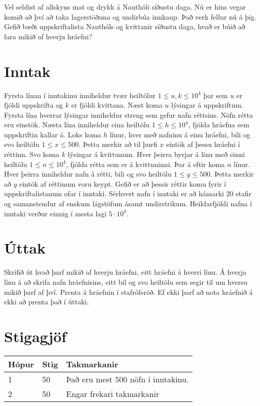 
Vel seldist af allskyns mat og drykk á Nauthóli síðustu daga. Nú er hins vegar
komið að því að taka lagerstöðuna og undirbúa innkaup. Það verk fellur nú á þig.
Gefið bæði uppskriftalista Nauthóls og kvittanir síðustu daga, hvað er búið að fara
mikið af hverju hráefni?

\section*{Inntak}
Fyrsta línan í inntakinu inniheldur tvær heiltölur $1 \leq u, k \leq 10^4$ þar sem
$u$ er fjöldi uppskrifta og $k$ er fjöldi kvittana. Næst koma $u$ lýsingar á uppskriftum.
Fyrsta lína hverrar lýsingar inniheldur streng sem gefur nafn réttsins. Nöfn rétta eru einstök.
Næsta lína inniheldur eina heiltölu $1 \leq h \leq 10^4$, fjölda hráefna sem uppskriftin
kallar á. Loks koma $h$ línur, hver með nafninu á einu hráefni, bili og svo heiltölu $1 \leq x \leq 500$.
Þetta merkir að til þurfi $x$ eintök af þessu hráefni í réttinn.
Svo koma $k$ lýsingar á kvittunum. Hver þeirra byrjar á línu með einni heiltölu $1 \leq n \leq 10^4$,
fjölda rétta sem er á kvittuninni. Þar á eftir koma $n$ línur. Hver þeirra inniheldur nafn á rétti,
bili og svo heiltölu $1 \leq y \leq 500$. Þetta merkir að $y$ eintök af réttinum voru keypt. Gefið
er að þessir réttir komu fyrir í uppskriftalistanum ofar í inntaki. Sérhvert nafn í inntaki er að hámarki
$20$ stafir og samanstendur af enskum lágstöfum ásamt undirstrikum. Heildarfjöldi nafna í inntaki verður
einnig í mesta lagi $5 \cdot 10^4$.

\section*{Úttak}
Skrifið út hvað þarf mikið af hverju hráefni, eitt hráefni á hverri línu. Á hverja línu á að skrifa
nafn hráefnisins, eitt bil og svo heiltölu sem segir til um hversu mikið þarf af því. Prenta á
hráefnin í stafrófsröð. Ef ekki þarf að nota hráefnið á ekki að prenta það í úttaki.

\section*{Stigagjöf}
\begin{tabular}{|l|l|l|}
\hline
Hópur & Stig & Takmarkanir \\ \hline
1     & 50   & Það eru mest $500$ nöfn í inntakinu. \\ \hline
2     & 50   & Engar frekari takmarkanir\\ \hline
\end{tabular}

